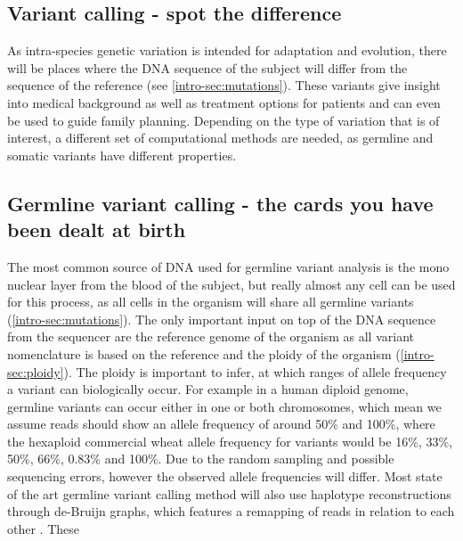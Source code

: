 
\subsection[Variant calling]{Variant calling - spot the difference}
\label{intro-sec:variantcalling}
As intra-species genetic variation is intended for adaptation and evolution, there will be places where the DNA sequence of the subject will differ from the sequence of the reference (see \autoref{intro-sec:mutations}). These variants give insight into medical background as well as treatment options for patients and can even be used to guide family planning. Depending on the type of variation that is of interest, a different set of computational methods are needed, as germline and somatic variants have different properties.

\subsection[Germline]{Germline variant calling - the cards you have been dealt at birth}
\label{intro-sec:germlinecalling}
The most common source of DNA used for germline variant analysis is the mono nuclear layer from the blood of the subject, but really almost any cell can be used for this process, as all cells in the organism will share all germline variants (\autoref{intro-sec:mutations}). The only important input on top of the DNA sequence from the sequencer are the reference genome of the organism as all variant nomenclature is based on the reference and the ploidy of the organism (\autoref{intro-sec:ploidy}). The ploidy is important to infer, at which ranges of allele frequency a variant can biologically occur. For example in a human diploid genome, germline variants can occur either in one or both chromosomes, which mean we assume reads should show an allele frequency of around 50\% and 100\%, where the hexaploid commercial wheat \cite{Mayer2014} allele frequency for variants would be 16\%, 33\%, 50\%, 66\%, 0.83\% and 100\%. Due to the random sampling and possible sequencing errors, however the observed allele frequencies will differ. 
Most state of the art germline variant calling method will also use haplotype reconstructions through de-Bruijn graphs, which features a remapping of reads in relation to each other \cite{Garrison2012,Lai2016,Kim2018,Benjamin2019,Cooke2021}. These


